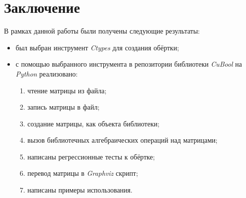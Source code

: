 \documentclass[14pt]{matmex-diploma}
\begin{document}
\section*{Заключение}
В рамках данной работы были получены следующие результаты:
\begin{itemize}
    \item был выбран инструмент \textit{Ctypes} для создания обёртки;
    \item с помощью выбранного инструмента в репозитории библиотеки \textit{CuBool}\cite{cuBool}
          на \textit{Python} реализовано:
        \begin{enumerate}
            \item чтение матрицы из файла;
            \item запись матрицы в файл;
            \item создание матрицы, как объекта библиотеки;
            \item вызов библиотечных алгебраических операций над матрицами;
            \item написаны регрессионные тесты к обёртке;
            \item перевод матрицы в \textit{Graphviz} скрипт;
            \item написаны примеры использования.
        \end{enumerate}
\end{itemize}   



\end{document}
